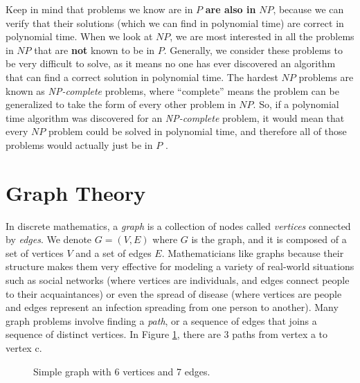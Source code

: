 Keep in mind that problems we know are in $P$ \textbf{are also in} $NP$, because we can
verify that their solutions (which we can find in polynomial time) are correct
in polynomial time. When we look at $NP$, we are most interested in all the problems
in $NP$ that are \textbf{not} known to be in $P$. Generally, we consider these
problems to be very difficult to solve, as it means
no one has ever discovered an algorithm that can find a correct solution in
polynomial time. The hardest $NP$ problems are known as \textit{NP-complete}
problems, where “complete” means the problem can be generalized to take the form
of every other problem in $NP$. So, if a polynomial time algorithm was discovered
for an \textit{NP-complete} problem, it would mean that every $NP$ problem could be solved
in polynomial time, and therefore all of those problems would actually just be
in $P$ \cite{Sipser_2006}.

\section{Graph Theory}

In discrete mathematics, a \textit{graph} is a collection of nodes called
\textit{vertices} connected by \textit{edges}. We denote $G = (V, E)$ where $G$ is
the graph, and it is composed of a set of vertices $V$ and a set of edges $E$.
Mathematicians like graphs because their structure makes them very effective for
modeling a variety of real-world situations such as social networks (where
vertices are individuals, and edges connect people to their acquaintances) or
even the spread of disease (where vertices are people and edges represent an
infection spreading from one person to another). Many graph problems involve
finding a \textit{path}, or a sequence
of edges that joins a sequence of distinct vertices. In Figure
\ref{fig:simple-graph}, there are 3 paths from vertex a to vertex c. 

\begin{figure}[H] \centering
  \caption{Simple graph with 6
    vertices and 7 edges.} \label{fig:simple-graph}
\end{figure}

